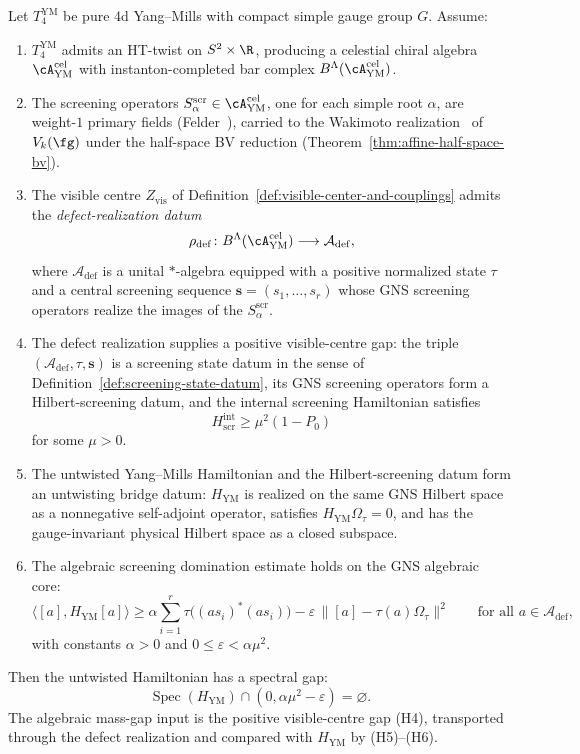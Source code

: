 \begin{theorem}
\label{thm:ym-mass-gap-reduction}
Let $T_4^{\mathrm{YM}}$ be pure $4$d Yang--Mills with compact
simple gauge group $G$. Assume:
\begin{enumerate}[label=\textup{(H\arabic*)}]
\item $T_4^{\mathrm{YM}}$ admits an HT-twist on $S^2\times \R$,
producing a celestial chiral algebra
$\cA^{\mathrm{cel}}_{\mathrm{YM}}$ with instanton-completed bar
complex $B^\Lambda(\cA^{\mathrm{cel}}_{\mathrm{YM}})$.
\item The screening operators
$S_\alpha^{\mathrm{scr}}\in \cA^{\mathrm{cel}}_{\mathrm{YM}}$, one
for each simple root $\alpha$, are weight-$1$ primary fields
(Felder~\cite{FelderVOA}), carried to the Wakimoto
realization~\cite{WakimotoFree}
of $V_k(\fg)$ under the half-space BV reduction
(Theorem~\ref{thm:affine-half-space-bv}).
\item The visible centre $Z_{\mathrm{vis}}$ of
Definition~\ref{def:visible-center-and-couplings} admits the
\emph{defect-realization datum}
\[
\rho_{\mathrm{def}}\colon
B^\Lambda(\cA^{\mathrm{cel}}_{\mathrm{YM}})
\longrightarrow
\mathcal A_{\mathrm{def}},
\]
where $\mathcal A_{\mathrm{def}}$ is a unital $*$-algebra equipped
with a positive normalized state $\tau$ and a central screening
sequence $\mathbf s=(s_1,\dots,s_r)$ whose GNS screening operators
realize the images of the $S_\alpha^{\mathrm{scr}}$.
\item The defect realization supplies a positive visible-centre gap:
the triple $(\mathcal A_{\mathrm{def}},\tau,\mathbf s)$ is a
screening state datum in the sense of
Definition~\ref{def:screening-state-datum}, its GNS screening
operators form a Hilbert-screening datum, and the internal screening
Hamiltonian satisfies
\[
H_{\mathrm{scr}}^{\mathrm{int}}\ge \mu^2(1-P_0)
\]
for some $\mu>0$.
\item The untwisted Yang--Mills Hamiltonian and the Hilbert-screening
datum form an untwisting bridge datum: $H_{\mathrm{YM}}$ is realized
on the same GNS Hilbert space as a nonnegative self-adjoint operator,
satisfies $H_{\mathrm{YM}}\Omega_\tau=0$, and has the gauge-invariant
physical Hilbert space as a closed subspace.
\item The algebraic screening domination estimate holds on the
GNS algebraic core:
\[
\bigl\langle [a],H_{\mathrm{YM}}[a]\bigr\rangle
\ge
\alpha\sum_{i=1}^r \tau\bigl((a s_i)^*(a s_i)\bigr)
-\varepsilon\,\bigl\|[a]-\tau(a)\Omega_\tau\bigr\|^2
\qquad\text{for all }a\in \mathcal A_{\mathrm{def}},
\]
with constants $\alpha>0$ and $0\le\varepsilon<\alpha\mu^2$.
\end{enumerate}
Then the untwisted Hamiltonian has a spectral gap:
\[
\operatorname{Spec}(H_{\mathrm{YM}})
\cap(0,\alpha\mu^2-\varepsilon)=\varnothing.
\]
The algebraic mass-gap input is the positive visible-centre gap (H4),
transported through the defect realization and compared with
$H_{\mathrm{YM}}$ by (H5)--(H6).
\end{theorem}

